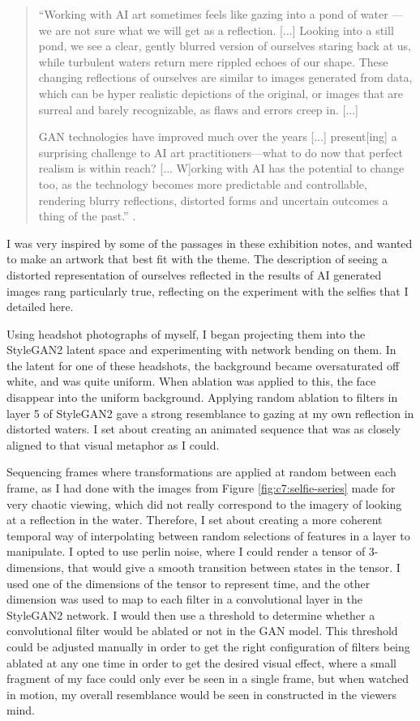 \begin{quote}
``Working with AI art sometimes feels like gazing into a pond of water — we are not sure what we will get as a reflection. [...] Looking into a still pond, we see a clear, gently blurred version of ourselves staring back at us, while turbulent waters return mere rippled echoes of our shape. These changing reflections of ourselves are similar to images generated from data, which can be hyper realistic depictions of the original, or images that are surreal and barely recognizable, as flaws and errors creep in. [...]

GAN technologies have improved much over the years [...] present[ing] a surprising challenge to AI art practitioners—what to do now that perfect realism is within reach? [... W]orking with AI has the potential to change too, as the technology becomes more predictable and controllable, rendering blurry reflections, distorted forms and uncertain outcomes a thing of the past.'' \citep{elliot2021reflections}.
\end{quote}

I was very inspired by some of the passages in these exhibition notes, and wanted to make an artwork that best fit with the theme. 
The description of seeing a distorted representation of ourselves reflected in the results of AI generated images rang particularly true, reflecting on the experiment with the selfies that I detailed here.

Using headshot photographs of myself, I began projecting them into the StyleGAN2 latent space and experimenting with network bending on them. 
In the latent for one of these headshots, the background became oversaturated off white, and was quite uniform. 
When ablation was applied to this, the face disappear into the uniform background. 
Applying random ablation to filters in layer 5 of StyleGAN2 gave a strong resemblance to gazing at my own reflection in distorted waters.
I set about creating an animated sequence that was as closely aligned to that visual metaphor as I could.

Sequencing frames where transformations are applied at random between each frame, as I had done with the images from Figure \ref{fig:c7:selfie-series} made for very chaotic viewing, which did not really correspond to the imagery of looking at a reflection in the water.
Therefore, I set about creating a more coherent temporal way of interpolating between random selections of features in a layer to manipulate. 
I opted to use perlin noise, where I could render a tensor of 3-dimensions, that would give a smooth transition between states in the tensor.
I used one of the dimensions of the tensor to represent time, and the other dimension was used to map to each filter in a convolutional layer in the StyleGAN2 network.
I would then use a threshold to determine whether a convolutional filter would be ablated or not in the GAN model.
This threshold could be adjusted manually in order to get the right configuration of filters being ablated at any one time in order to get the desired visual effect, where a small fragment of my face could only ever be seen in a single frame, but when watched in motion, my overall resemblance would be seen in constructed in the viewers mind. 

